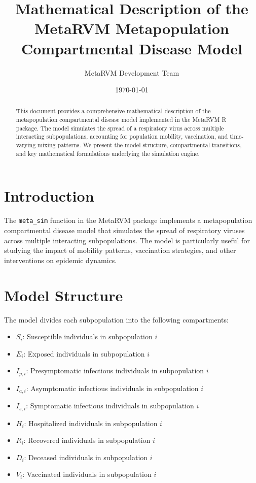 \documentclass{article}
\title{Mathematical Description of the MetaRVM Metapopulation Compartmental Disease Model}
\author{MetaRVM Development Team}
\date{\today}
\begin{document}
\maketitle

\begin{abstract}
This document provides a comprehensive mathematical description of the metapopulation compartmental disease model implemented in the MetaRVM R package. The model simulates the spread of a respiratory virus across multiple interacting subpopulations, accounting for population mobility, vaccination, and time-varying mixing patterns. We present the model structure, compartmental transitions, and key mathematical formulations underlying the simulation engine.
\end{abstract}

\section{Introduction}

The \texttt{meta\_sim} function in the MetaRVM package implements a metapopulation compartmental disease model that simulates the spread of respiratory viruses across multiple interacting subpopulations. The model is particularly useful for studying the impact of mobility patterns, vaccination strategies, and other interventions on epidemic dynamics.

\section{Model Structure}

The model divides each subpopulation into the following compartments:

\begin{itemize}
    \item $S_i$: Susceptible individuals in subpopulation $i$
    \item $E_i$: Exposed individuals in subpopulation $i$
    \item $I_{p,i}$: Presymptomatic infectious individuals in subpopulation $i$
    \item $I_{a,i}$: Asymptomatic infectious individuals in subpopulation $i$
    \item $I_{s,i}$: Symptomatic infectious individuals in subpopulation $i$
    \item $H_i$: Hospitalized individuals in subpopulation $i$
    \item $R_i$: Recovered individuals in subpopulation $i$
    \item $D_i$: Deceased individuals in subpopulation $i$
    \item $V_i$: Vaccinated individuals in subpopulation $i$
\end{itemize}
\end{document}
